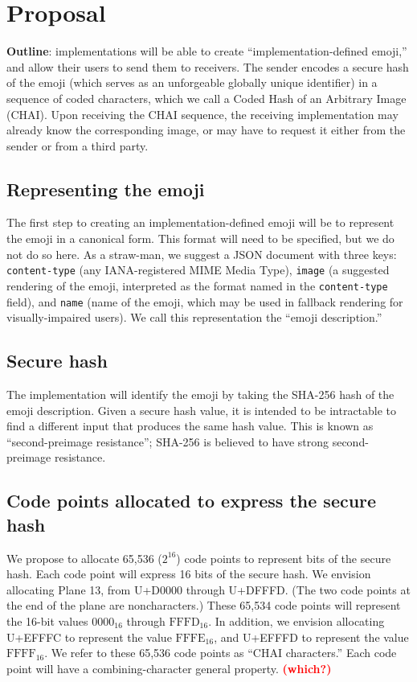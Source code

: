 \documentclass[12pt]{article}
\begin{document}
\section{Proposal}

\textbf{Outline}: implementations will be able to create
``implementation-defined emoji,'' and allow their users to send them
to receivers. The sender encodes a secure hash of the emoji (which
serves as an unforgeable globally unique identifier) in a sequence of
coded characters, which we call a Coded Hash of an Arbitrary Image
(CHAI). Upon receiving the CHAI sequence, the receiving implementation
may already know the corresponding image, or may have to request it
either from the sender or from a third party.

\subsection{Representing the emoji}

The first step to creating an implementation-defined emoji will be to
represent the emoji in a canonical form. This format will need to be
specified, but we do not do so here. As a straw-man, we suggest a JSON
document with three keys: \texttt{content-type} (any IANA-registered MIME
Media Type), \texttt{image} (a suggested rendering of the emoji,
interpreted as the format named in the \texttt{content-type} field), and
\texttt{name} (name of the emoji, which may be used in fallback
rendering for visually-impaired users). We call this representation
the ``emoji description.''

\subsection{Secure hash}

The implementation will identify the emoji by taking the SHA-256 hash
of the emoji description. Given a secure hash value, it is intended to be
intractable to find a different input that produces the same
hash value. This is known as ``second-preimage resistance'';
SHA-256 is believed to have strong second-preimage resistance.

\subsection{Code points allocated to express the secure hash}

We propose to allocate 65,536 ($2^{16}$) code points to represent bits
of the secure hash. Each code point will express 16 bits of the secure
hash. We envision allocating Plane 13, from U+D0000 through
U+DFFFD. (The two code points at the end of the plane are
noncharacters.) These 65,534 code points will represent the 16-bit
values $\mathrm{0000}_{16}$ through $\mathrm{FFFD}_{16}$. In addition,
we envision allocating U+EFFFC to represent the value
$\mathrm{FFFE}_{16}$, and U+EFFFD to represent the value
$\mathrm{FFFF}_{16}$. We refer to these 65,536 code points as ``CHAI
characters.'' Each code point will have a combining-character general
property. \textcolor{red}{\bf (which?)}
\end{document}
